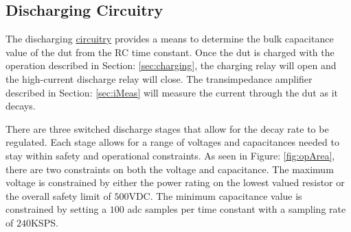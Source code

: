 \subsection{Discharging Circuitry}

The discharging \hyperlink{sch:discharging}{circuitry} provides a means to determine the bulk capacitance value of the \gls{dut} from the RC time constant. Once the \gls{dut} is charged with the operation described in Section: \ref{sec:charging}, the charging relay will open and the high-current discharge relay will close. The transimpedance amplifier described in Section: \ref{sec:iMeas} will measure the current through the \gls{dut} as it decays.

There are three switched discharge stages that allow for the decay rate to be regulated. Each stage allows for a range of voltages and capacitances needed to stay within safety and operational constraints. As seen in Figure: \ref{fig:opArea}, there are two constraints on both the voltage and capacitance. The maximum voltage is constrained by either the power rating on the lowest valued resistor or the overall safety limit of $500$VDC. The minimum capacitance value is constrained by setting a $100$ \gls{adc} samples per time constant with a sampling rate of $240$KSPS.



